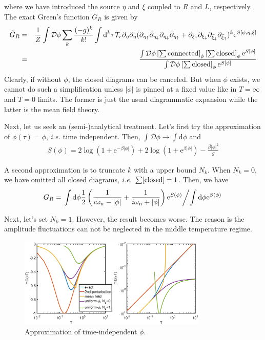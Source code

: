 \documentclass[10pt]{article}
\newcommand{\bea}{\begin{eqnarray}}
\newcommand{\eea}{\end{eqnarray}}
\newcommand{\md}{\mathrm{d}}
\newcommand{\ie}{\textit{i.e.{ }}}
\newcommand{\me}{\mathrm{e}}
\begin{document}
where we have introduced the source $\eta$ and $\xi$ coupled to $R$ and $L$, respectively. 
The exact Green's function $G_R$ is given by
\bea \hat{G}_R&=&\frac{1}{Z}\int \mathcal{D}\phi \sum_k \frac{(-g)^k}{k!} \int\md^k\tau\mathcal{T}_\tau \partial_{\bar{\eta}} \partial_\eta (\partial_{\eta_\uparrow}\partial_{\eta_\downarrow}\partial_{\bar{\eta}_\downarrow}\partial_{\bar{\eta}_\uparrow}+\partial_{\xi_\uparrow}\partial_{\xi_\downarrow}\partial_{\bar{\xi}_\downarrow}\partial_{\bar{\xi}_\uparrow})^k \me^{S[\phi,\eta,\xi]} \\
&=&\frac{\int\mathcal{D}\phi \left[\sum {\rm connected}\right]_\phi\left[\sum {\rm closed}\right]_\phi \me^{S[\phi]} }{\int\mathcal{D}\phi \left[\sum {\rm closed}\right]_\phi \me^{S[\phi]}}
\eea
Clearly, if without $\phi$, the closed diagrams can be canceled. But when $\phi$ exists, we cannot do such a simplification unless $|\phi|$ is pinned at a fixed value like in $T=\infty$ and $T=0$ limits. The former is just the usual diagrammatic expansion while the latter is the mean field theory. 

Next, let us seek an (semi-)analytical treatment. Let's first try the approximation of $\phi(\tau)=\phi$, \ie time independent. Then, $\int \mathcal{D}\phi\rightarrow\int\md\phi$ and
\bea S(\phi)=2\log(1+\me^{-\beta|\phi|})+2\log(1+\me^{\beta|\phi|})-\frac{\beta|\phi|^2}{g} \eea  

A second approximation is to truncate $k$ with a upper bound $N_k$. When $N_k=0$, we have omitted all closed diagrams, \ie $\sum[{\rm closed}]=1$. Then, we have
\bea G_R=\left. \int\md \phi \frac{1}{2}\left(\frac{1}{i\omega_n-|\phi|}+\frac{1}{i\omega_n+|\phi|}\right) \me^{S(\phi)}  \middle/ \int\md  \phi \me^{S(\phi)}\right. \eea

Next, let's set $N_k=1$. However, the result becomes worse. The reason is the amplitude fluctuations can not be neglected in the middle temperature regime.  
\begin{figure}[h]
    \begin{center}
    \includegraphics[width=0.8\textwidth]{result.eps}
    \caption{Approximation of time-independent $\phi$.}
    \end{center}
\end{figure}
\end{document}
